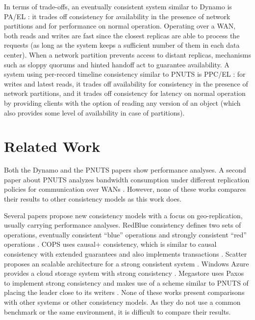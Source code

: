 \documentclass[man,floatsintext,12pt]{apa6}
\begin{document}
In terms of trade-offs, an eventually consistent system similar to Dynamo is
PA/EL \parencite{Abadi2012}: it trades off consistency for availability in the
presence of network partitions and for performance on normal operation.
Operating over a WAN, both reads and writes are fast since the closest replicas
are able to process the requests (as long as the system keeps a sufficient
number of them in each data center). When a network partition prevents access
to distant replicas, mechanisms such as sloppy quorums and hinted handoff act
to guarantee availability. A system using per-record timeline consistency
similar to PNUTS is PPC/EL \parencite{Abadi2012}: for writes and latest reads,
it trades off availability for consistency in the presence of network
partitions, and it trades off consistency for latency on normal operation by
providing clients with the option of reading any version of an object (which
also provides some level of availability in case of partitions).

\section{Related Work}

Both the Dynamo \parencite{DeCandia2007} and the PNUTS papers
\parencite{Cooper2008} show performance analyses. A second paper about PNUTS
analyzes bandwidth consumption under different replication policies for
communication over WANs \parencite{Kadambi2011}. However, none of these works
compares their results to other consistency models as this work does.

Several papers propose new consistency models with a focus on geo-replication,
usually carrying performance analyses. RedBlue consistency defines two sets
of operations, eventually consistent ``blue'' operations and strongly consistent
``red'' operations \parencite{Li2012}. COPS uses causal+ consistency, which is similar
to causal consistency with extended guarantees and also implements transactions
\parencite{Lloyd2011}. Scatter proposes an scalable architecture for a strong
consistent system \parencite{Glendenning2011}. Windows Azure provides a cloud
storage system with strong consistency \parencite{Calder2011}. Megastore uses
Paxos to implement strong consistency and makes use of a scheme similar to
PNUTS of placing the leader close to its writers \parencite{Baker2011}. None of
these works present comparisons with other systems or other consistency models.
As they do not use a common benchmark or the same environment, it is difficult
to compare their results.
\end{document}
